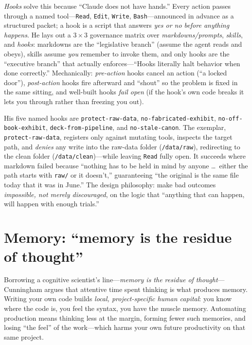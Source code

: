 \documentclass[11pt]{article}
\begin{document}
\emph{Hooks} solve this because ``Claude does not have hands.'' Every action
passes through a named tool---\texttt{Read}, \texttt{Edit}, \texttt{Write},
\texttt{Bash}---announced in advance as a structured packet; a hook is a script
that answers \emph{yes or no before anything happens}. He lays out a $3\times3$
governance matrix over \emph{markdowns/prompts}, \emph{skills}, and \emph{hooks}:
markdowns are the ``legislative branch'' (assume the agent reads and obeys),
skills assume \emph{you} remember to invoke them, and only hooks are the
``executive branch'' that actually enforces---``Hooks literally halt behavior
when done correctly.'' Mechanically: \emph{pre-action} hooks cancel an action
(``a locked door''), \emph{post-action} hooks fire afterward and ``shout'' so the
problem is fixed in the same sitting, and well-built hooks \emph{fail open} (if
the hook's own code breaks it lets you through rather than freezing you out).

His five named hooks are \texttt{protect-raw-data}, \texttt{no-fabricated-exhibit},
\texttt{no-off-book-exhibit}, \texttt{deck-from-pipeline}, and
\texttt{no-stale-canon}. The exemplar, \texttt{protect-raw-data}, registers only
against mutating tools, inspects the target path, and \emph{denies} any write
into the raw-data folder (\texttt{/data/raw}), redirecting to the clean folder
(\texttt{/data/clean})---while leaving \texttt{Read} fully open. It succeeds
where markdown failed because ``nothing has to be held in mind by anyone \ldots\
either the path starts with \texttt{raw/} or it doesn't,'' guaranteeing ``the
original is the same file today that it was in June.'' The design philosophy:
make bad outcomes \emph{impossible, not merely discouraged}, on the logic that
``anything that can happen, will happen with enough trials.''

\section{Memory: ``memory is the residue of thought''}
Borrowing a cognitive scientist's line---\emph{memory is the residue of
thought}---Cunningham argues that attentive time spent thinking is what produces
memory. Writing your own code builds \emph{local, project-specific human capital}:
you know where the code is, you feel the syntax, you have the muscle memory.
Automating production means thinking less at the margin, forming fewer such
memories, and losing ``the feel'' of the work---which harms your own future
productivity on that same project.
\end{document}
